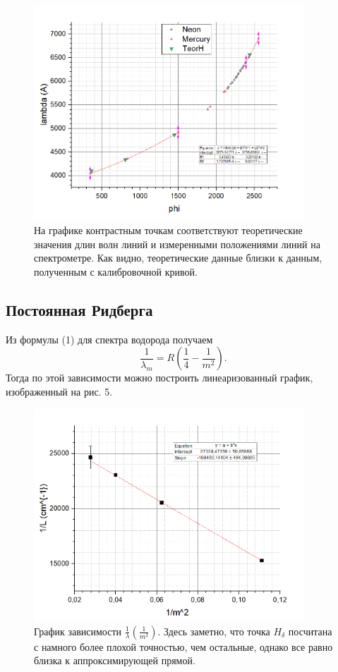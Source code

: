 \documentclass[a4paper, 14pt]{extarticle}%
\newcommand\ECaption[1]{%
     \captionsetup{font=footnotesize}%
     \caption{#1}}
\begin{document}
\begin{figure}[h!]
\begin{center}
\includegraphics[width=0.9\textwidth]{gr2}
\end{center}
\ECaption{На графике контрастным точкам соответствуют теоретические значения длин волн линий и измеренными положениями линий на спектрометре. Как видно, теоретические данные близки к данным, полученным с калибровочной кривой.}
\end{figure}

\subsection*{Постоянная Ридберга}

Из формулы (1) для спектра водорода получаем 
\[\dfrac{1}{\lambda_m} = R\left( \frac{1}{4} - \frac{1}{m^2}\right) .\]
Тогда по этой зависимости можно построить линеаризованный график, изображенный на рис. 5.

\begin{figure}[h!]
\begin{center}
\includegraphics[width=0.9\textwidth]{gr3}
\end{center}
\ECaption{График зависимости $\frac{1}{\lambda}(\frac{1}{m^2})$. Здесь заметно, что точка $H_{\delta}$ посчитана с намного более плохой точностью, чем остальные, однако все равно близка к аппроксимирующей прямой. }
\end{figure}
\end{document}
